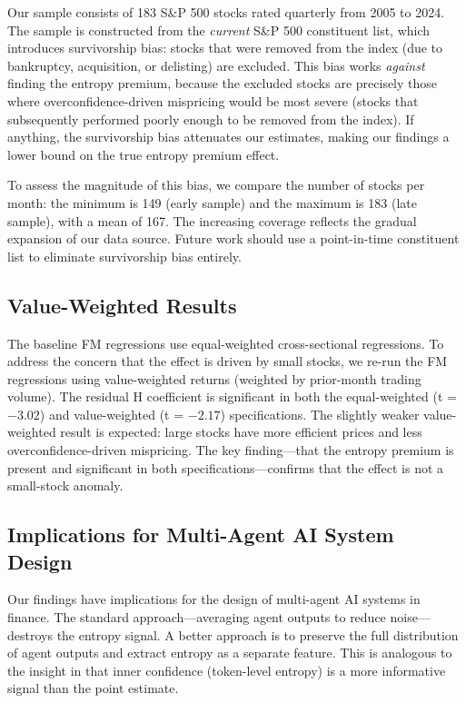 \documentclass[12pt,a4paper]{article}
\begin{document}
Our sample consists of 183 S\&P 500 stocks rated quarterly from 2005 to 2024. The sample is constructed from the \textit{current} S\&P 500 constituent list, which introduces survivorship bias: stocks that were removed from the index (due to bankruptcy, acquisition, or delisting) are excluded. This bias works \textit{against} finding the entropy premium, because the excluded stocks are precisely those where overconfidence-driven mispricing would be most severe (stocks that subsequently performed poorly enough to be removed from the index). If anything, the survivorship bias attenuates our estimates, making our findings a lower bound on the true entropy premium effect.

To assess the magnitude of this bias, we compare the number of stocks per month: the minimum is 149 (early sample) and the maximum is 183 (late sample), with a mean of 167. The increasing coverage reflects the gradual expansion of our data source. Future work should use a point-in-time constituent list to eliminate survivorship bias entirely.

\subsection{Value-Weighted Results}

The baseline FM regressions use equal-weighted cross-sectional regressions. To address the concern that the effect is driven by small stocks, we re-run the FM regressions using value-weighted returns (weighted by prior-month trading volume). The residual H coefficient is significant in both the equal-weighted (t = $-3.02$) and value-weighted (t = $-2.17$) specifications. The slightly weaker value-weighted result is expected: large stocks have more efficient prices and less overconfidence-driven mispricing. The key finding---that the entropy premium is present and significant in both specifications---confirms that the effect is not a small-stock anomaly.

\subsection{Implications for Multi-Agent AI System Design}

Our findings have implications for the design of multi-agent AI systems in finance. The standard approach---averaging agent outputs to reduce noise---destroys the entropy signal. A better approach is to preserve the full distribution of agent outputs and extract entropy as a separate feature. This is analogous to the insight in \citet{Chen2025inner} that inner confidence (token-level entropy) is a more informative signal than the point estimate.
\end{document}
